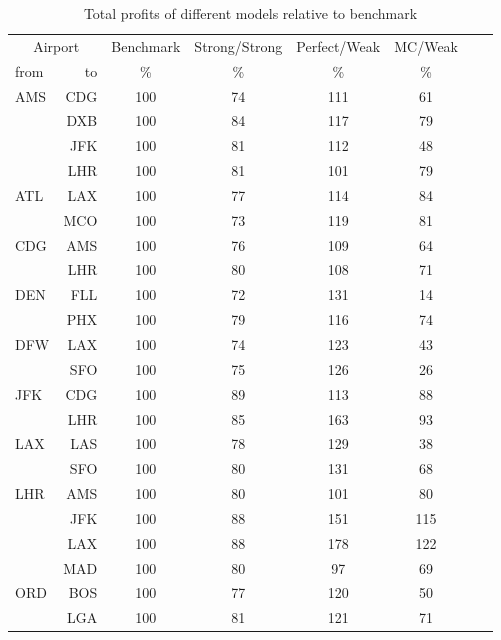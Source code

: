 \begin{table}
    \begin{center}
        \small
        \begin{tabular}{l r c c c c c c}
            \toprule
            \multicolumn{2}{c}{Airport}  & Benchmark &  Strong/Strong  &  Perfect/Weak  &  MC/Weak  \\[.4ex]
            from  &  to  &  \%  & \%  &  \%  & \%   \\
            \midrule
AMS  &  CDG &    100  &     74  &    111  &     61  \\
     &  DXB &    100  &     84  &    117  &     79  \\
     &  JFK &    100  &     81  &    112  &     48  \\
     &  LHR &    100  &     81  &    101  &     79  \\[.5ex]
ATL  &  LAX &    100  &     77  &    114  &     84  \\
     &  MCO &    100  &     73  &    119  &     81  \\[.5ex]
CDG  &  AMS &    100  &     76  &    109  &     64  \\
     &  LHR &    100  &     80  &    108  &     71  \\[.5ex]
DEN  &  FLL &    100  &     72  &    131  &     14  \\
     &  PHX &    100  &     79  &    116  &     74  \\[.5ex]
DFW  &  LAX &    100  &     74  &    123  &     43  \\
     &  SFO &    100  &     75  &    126  &     26  \\[.5ex]
JFK  &  CDG &    100  &     89  &    113  &     88  \\
     &  LHR &    100  &     85  &    163  &     93  \\[.5ex]
LAX  &  LAS &    100  &     78  &    129  &     38  \\
     &  SFO &    100  &     80  &    131  &     68  \\[.5ex]
LHR  &  AMS &    100  &     80  &    101  &     80  \\
     &  JFK &    100  &     88  &    151  &    115  \\
     &  LAX &    100  &     88  &    178  &    122  \\
     &  MAD &    100  &     80  &     97  &     69  \\[.5ex]
ORD  &  BOS &    100  &     77  &    120  &     50  \\
     &  LGA &    100  &     81  &    121  &     71  \\
            \bottomrule
        \end{tabular}
        \caption{Total profits of different models relative to benchmark}
        \label{tbl:resultsRelativeBenchmark}
    \end{center}
\end{table}

